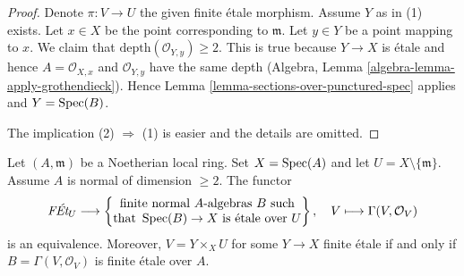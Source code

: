 \begin{proof}
Denote $\pi : V \to U$ the given finite \'etale morphism.
Assume $Y$ as in (1) exists. Let $x \in X$ be the point
corresponding to $\mathfrak m$.
Let $y \in Y$ be a point mapping to $x$. We claim that
$\text{depth}(\mathcal{O}_{Y, y}) \geq 2$.
This is true because $Y \to X$ is \'etale and hence
$A = \mathcal{O}_{X, x}$ and $\mathcal{O}_{Y, y}$ have
the same depth (Algebra, Lemma \ref{algebra-lemma-apply-grothendieck}).
Hence Lemma \ref{lemma-sections-over-punctured-spec}
applies and $Y = \mathop{\mathrm{Spec}}(B)$.

\medskip\noindent
The implication (2) $\Rightarrow$ (1) is easier and the
details are omitted.
\end{proof}

\begin{lemma}
\label{lemma-reformulate-purity-normal}
Let $(A, \mathfrak m)$ be a Noetherian local ring. Set $X = \mathop{\mathrm{Spec}}(A)$
and let $U = X \setminus \{\mathfrak m\}$. Assume $A$ is normal
of dimension $\geq 2$. The functor
$$
\textit{F\'Et}_U \longrightarrow
\left\{
\begin{matrix}
\text{finite normal }A\text{-algebras }B\text{ such} \\
\text{that }\mathop{\mathrm{Spec}}(B) \to X\text{ is \'etale over }U
\end{matrix}
\right\},
\quad
V \longmapsto \Gamma(V, \mathcal{O}_V)
$$
is an equivalence. Moreover, $V = Y \times_X U$ for some $Y \to X$
finite \'etale if and only if $B = \Gamma(V, \mathcal{O}_V)$
is finite \'etale over $A$.
\end{lemma}

